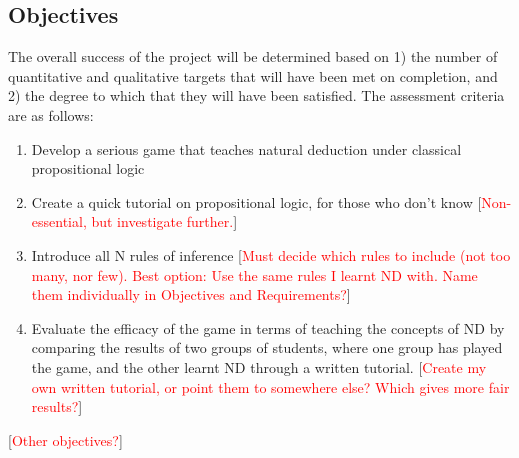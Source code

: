 \documentclass[a4paper]{article}
\newcommand{\comment}[1]{[\textcolor{red}{#1}]} %
\begin{document}
\subsection{Objectives}
The overall success of the project will be determined based on 1) the number of quantitative and qualitative targets that will have been met on completion, and 2) the degree to which that they will have been satisfied. The assessment criteria are as follows:
\begin{enumerate}
  \item Develop a serious game that teaches natural deduction under classical propositional logic
  \item Create a quick tutorial on propositional logic, for those who don't know \comment{Non-essential, but investigate further.}
  \item Introduce all N rules of inference \comment{Must decide which rules to include (not too many, nor few). Best option: Use the same rules I learnt ND with. Name them individually in Objectives and Requirements?}
  \item Evaluate the efficacy of the game in terms of teaching the concepts of ND by comparing the results of two groups of students, where one group has played the game, and the other learnt ND through a written tutorial. \comment{Create my own written tutorial, or point them to somewhere else? Which gives more fair results?}
\end{enumerate}
\comment{Other objectives?}
\end{document}
